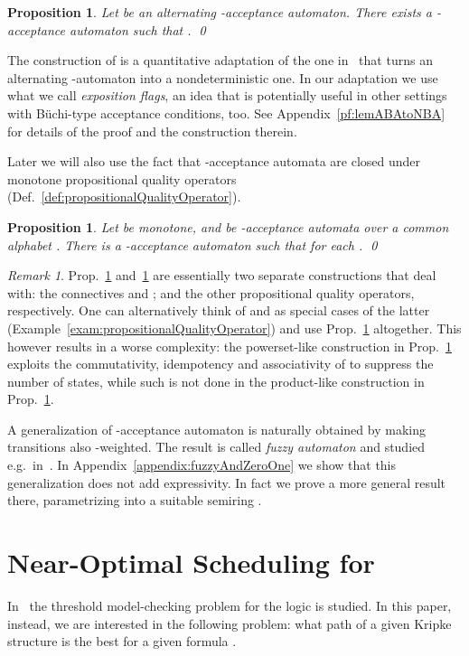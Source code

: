 \documentclass[a4paper,USenglish,numberwithinsect]{lipics}
\theoremstyle{definition}
\theoremstyle{remark}
\newtheorem{rem}[defi]{Remark}
\theoremstyle{plain}
\newtheorem{prop}[defi]{Proposition}
\begin{document}
\begin{prop}\label{prop:ABAtoNBA}
  Let  be an alternating
 {}-acceptance  automaton. There exists a {}-acceptance
 automaton  such that . 
\qed
\end{prop}
The  construction of  is a quantitative adaptation of the
 one in~\cite{MiyanoH84} that turns an alternating -automaton into
a  nondeterministic one. In our adaptation we use what we call
 \emph{exposition flags}, an idea that is potentially useful in other
 settings with B\"uchi-type acceptance conditions, too. 
See Appendix~\ref{pf:lemABAtoNBA} for details of the proof and the
 construction therein.



Later we will also use the fact that
-acceptance automata are closed under monotone propositional
quality operators (Def.~\ref{def:propositionalQualityOperator}).  


\begin{prop}\label{prop:ClosedUnderIncOperator}
  Let  be monotone, and
 be
-acceptance automata
 over a common alphabet . There is a -acceptance
 automaton  such that
  for each . \qed
\end{prop}


\begin{rem}
 Prop.~\ref{prop:ABAtoNBA} and~\ref{prop:ClosedUnderIncOperator} are
 essentially two separate constructions that deal with: the connectives
  and ; and the other propositional quality operators, respectively. 
 One can alternatively think of  and  as special cases of the latter 
 (Example~\ref{exam:propositionalQualityOperator}) and  use
 Prop.~\ref{prop:ClosedUnderIncOperator} altogether. 
This however results in a worse
complexity: the powerset-like construction in Prop.~\ref{prop:ABAtoNBA}
 exploits the commutativity, idempotency and associativity of  to 
 suppress the number of states, while such  is not done in the
 product-like
 construction in Prop.~\ref{prop:ClosedUnderIncOperator}.
\end{rem}

A generalization of -acceptance automaton
  is naturally obtained by making transitions also
-weighted. The result is called \emph{fuzzy automaton}
  and studied e.g.\ in~\cite{Rahonis05}.
  In Appendix~\ref{appendix:fuzzyAndZeroOne} we show that this generalization does not add expressivity. In
  fact we prove a more general result there, parametrizing 
  into a suitable semiring 
  .




\section{Near-Optimal Scheduling for  }
\label{sec:nearOptimalSchedulerSynth}
In~\cite{AlmagorBK14,AlmagorBK13ExtendedPreprint} the threshold
model-checking problem for the logic 
is studied. 
In this paper, instead, we are interested in the following problem:  what
path of a given Kripke structure  is the best for a given
 formula . 
\end{document}
